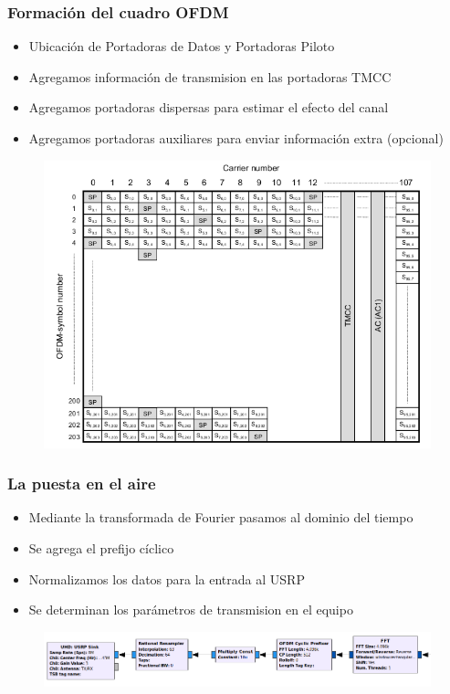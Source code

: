 \begin{frame}
\frametitle{Formación del cuadro OFDM}
\begin{itemize}	
	\item { Ubicación de Portadoras de Datos y Portadoras Piloto}
	\item {	Agregamos información de transmision en las portadoras TMCC}
	\item { Agregamos portadoras dispersas para estimar el efecto del canal }
	\item { Agregamos portadoras auxiliares para enviar información extra (opcional) }
\end{itemize}
\begin{figure}
	\includegraphics[scale=0.27]{ofdm_frame}
\end{figure}
\end{frame}
\begin{frame}
\frametitle{La puesta en el aire}
\begin{itemize}	
	\item { Mediante la transformada de Fourier pasamos al dominio del tiempo}
	\item {	Se agrega el prefijo cíclico}
	\item { Normalizamos los datos para la entrada al USRP }
	\item { Se determinan los parámetros de transmision en el equipo }
\end{itemize}
\begin{figure}
	\includegraphics[scale=0.3]{final_tx}
\end{figure}
\end{frame}